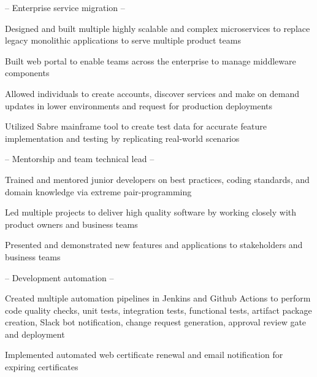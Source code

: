 \begin{cventries}
  \cventry
    { -- Enterprise service migration -- } %
    {} %
    {} %
    {} %
    {
      \begin{cvitems} %
        \item {Designed and built multiple highly scalable and complex microservices to replace legacy monolithic applications to serve multiple product teams}
        \item {Built web portal to enable teams across the enterprise to manage middleware components}
        \item {Allowed individuals to create accounts, discover services and make on demand updates in lower environments and request for production deployments}
        \item {Utilized Sabre mainframe tool to create test data for accurate feature implementation and testing by replicating real-world scenarios}
      \end{cvitems}
    }

  \cventry
    { -- Mentorship and team technical lead -- } %
    {} %
    {} %
    {} %
    {
      \begin{cvitems} %
        \item {Trained and mentored junior developers on best practices, coding standards, and domain knowledge via extreme pair-programming}
        \item {Led multiple projects to deliver high quality software by working closely with product owners and business teams}
        \item {Presented and demonstrated new features and applications to stakeholders and business teams}
      \end{cvitems}
    }

  \cventry
    { -- Development automation -- } %
    {} %
    {} %
    {} %
    {
      \begin{cvitems} %
        \item {Created multiple automation pipelines in Jenkins and Github Actions to perform code quality checks, unit tests, integration tests, functional tests, artifact package creation, Slack bot notification, change request generation, approval review gate and deployment}
        \item {Implemented automated web certificate renewal and email notification for expiring certificates}
      \end{cvitems}
    }


\end{cventries}
